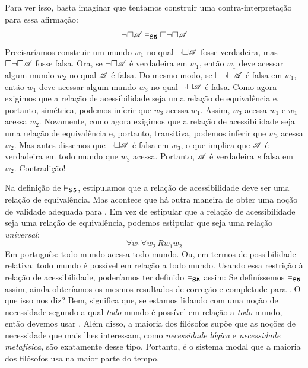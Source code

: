 Para ver isso, basta imaginar que tentamos construir uma contra-interpretação para essa afirmação:
\[
	\neg\Box\mathscr{A} \vDash_{\mathbf{S5}}  \Box \neg\Box \mathscr{A}
\]
Precisaríamos construir um mundo $w_1$ no qual $\neg\Box\mathscr{A}$ fosse verdadeira, mas $\Box \neg\Box\mathscr{A}$ fosse falsa.
Ora, se $\neg\Box\mathscr{A}$ é verdadeira em $w_1$, então $w_1$ deve acessar algum mundo $w_2$ no qual $\mathscr{A}$ é falsa. Do mesmo modo, se $\Box \neg\Box\mathscr{A}$ é falsa em $w_1$, então $w_1$ deve acessar algum mundo $w_3$ no qual $\neg\Box\mathscr{A}$ é falsa. Como agora exigimos que a relação de acessibilidade seja uma relação de equivalência e, portanto, simétrica, podemos inferir que $w_3$ acessa $w_1$. Assim, $w_3$ acessa $w_1$ e $w_1$ acessa $w_2$. Novamente, como agora exigimos que a relação de acessibilidade seja uma relação de equivalência e, portanto, transitiva, podemos inferir que $w_3$ acessa $w_2$. Mas antes dissemos que $\neg\Box\mathscr{A}$ é falsa em $w_3$, o que implica que $\mathscr{A}$ é verdadeira em todo mundo que $w_3$ acessa. Portanto, $\mathscr{A}$ é verdadeira \emph{e} falsa em $w_2$. Contradição!

Na definição de $\vDash_{\mathbf{S5}}$, estipulamos que a relação de acessibilidade deve ser uma relação de equivalência. Mas acontece que há outra maneira de obter uma noção de validade adequada para \mlSfive. Em vez de estipular que a relação de acessibilidade seja uma relação de equivalência, podemos estipular que seja uma relação \emph{universal}:
\[\forall w_1\forall w_2\, Rw_1w_2\]
Em português: todo mundo acessa todo mundo. Ou, em termos de possibilidade relativa: todo mundo é possível em relação a todo mundo. Usando essa restrição à relação de acessibilidade, poderíamos ter definido $\vDash_{\mathbf{S5}}$ assim:
Se definíssemos $\vDash_{\mathbf{S5}}$ assim, ainda obteríamos os mesmos resultados de correção e completude para \mlSfive. O que isso nos diz? Bem, significa que, se estamos lidando com uma noção de necessidade segundo a qual \emph{todo} mundo é possível em relação a \emph{todo} mundo, então devemos usar \mlSfive. Além disso, a maioria dos filósofos supõe que as noções de necessidade que mais lhes interessam, como \emph{necessidade lógica} e \emph{necessidade metafísica}, são exatamente desse tipo. Portanto, \mlSfive{} é o sistema modal que a maioria dos filósofos usa na maior parte do tempo.

